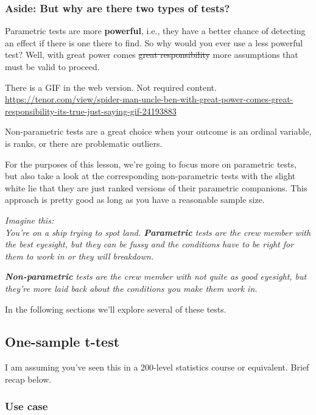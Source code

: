 \documentclass[
  openany]{book}
\begin{document}
\hypertarget{aside-but-why-are-there-two-types-of-tests}{%
\subsubsection{Aside: But why are there two types of tests?}\label{aside-but-why-are-there-two-types-of-tests}}

Parametric tests are more \textbf{powerful}, i.e., they have a better chance of detecting an effect if there is one there to find. So why would you ever use a less powerful test? Well, with great power comes \sout{great responsibility} more assumptions that must be valid to proceed.

There is a GIF in the web version. Not required content. \url{https://tenor.com/view/spider-man-uncle-ben-with-great-power-comes-great-responsibility-its-true-just-saying-gif-24193883}

Non-parametric tests are a great choice when your outcome is an ordinal variable, is ranks, or there are problematic outliers.

For the purposes of this lesson, we're going to focus more on parametric tests, but also take a look at the corresponding non-parametric tests with the slight white lie that they are just ranked versions of their parametric companions. This approach is pretty good as long as you have a reasonable sample size.

\emph{Imagine this:}\\
\emph{You're on a ship trying to spot land. \textbf{Parametric} tests are the crew member with the best eyesight, but they can be fussy and the conditions have to be right for them to work in or they will breakdown.}

\emph{\textbf{Non-parametric} tests are the crew member with not quite as good eyesight, but they're more laid back about the conditions you make them work in.}

In the following sections we'll explore several of these tests.

\hypertarget{one-sample-t-test}{%
\subsection{One-sample t-test}\label{one-sample-t-test}}

I am assuming you've seen this in a 200-level statistics course or equivalent. Brief recap below.

\hypertarget{use-case}{%
\subsubsection{Use case}\label{use-case}}
\end{document}
